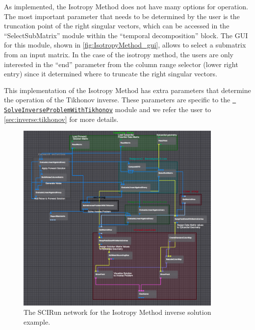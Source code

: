 	As implemented, the Isotropy Method does not have many options for
	operation.  The most important parameter that needs to be
	determined by the user is the truncation point of the right
	singular vectors, which can be accessed in the ``SelectSubMatrix''
	module within the ``temporal decomposition'' block.  The GUI for
	this module, shown in \autoref{fig:IsotropyMethod_gui}, allows to
	select a submatrix from an input matrix.  In the case of the
	isotropy method, the users are only interested in the ``end''
	parameter from the column range selector (lower right entry) since
	it determined where to truncate the right singular vectors.
    
	This implementation of the Isotropy Method has extra parameters
	that determine the operation of the Tikhonov inverse.  These
	parameters are specific to the
	\href{http://scirundocwiki.sci.utah.edu/SCIRunDocs/index.php/CIBC:Documentation:SCIRun:Reference:BioPSE:SolveInverseProblemWithTikhonov}{{\tt
	SolveInverseProblemWithTikhonov}} module and we refer the user to
	\autoref{sec:inverse:tikhonov} for more details.
    
   \begin{figure}
       \begin{center}
       \includegraphics[width=0.9\textwidth]{ECGToolkitGuide_figures/IsotropyMethod_networkExample.png}
       \caption{The SCIRun network for the Isotropy Method inverse solution example.}
       \label{fig:IsotropyMethod}
       \end{center}
   \end{figure}
    
